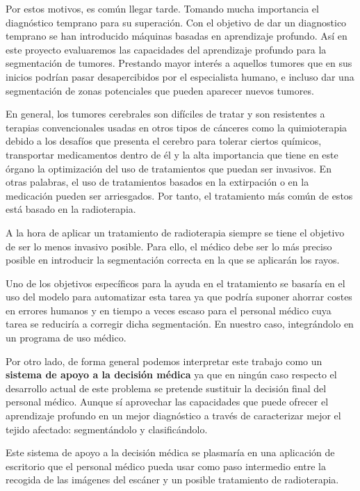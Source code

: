 Por estos motivos, es común llegar tarde. Tomando mucha importancia el diagnóstico temprano para su superación. Con el objetivo de dar un diagnostico temprano se han introducido máquinas basadas en aprendizaje profundo. Así en este proyecto evaluaremos las capacidades del aprendizaje profundo para la segmentación de tumores. Prestando mayor interés a aquellos tumores que en sus inicios podrían pasar desapercibidos por el especialista humano, e incluso dar una segmentación de zonas potenciales que pueden aparecer nuevos tumores.

En general, los tumores cerebrales son difíciles de tratar y son resistentes a terapias convencionales usadas en otros tipos de cánceres como la quimioterapia debido a los desafíos que presenta el cerebro para tolerar ciertos químicos, transportar medicamentos dentro de él y la alta importancia que tiene en este órgano la optimización del uso de tratamientos que puedan ser invasivos. En otras palabras, el uso de tratamientos basados en la extirpación o en la medicación pueden ser arriesgados. Por tanto, el tratamiento más común de estos está basado en la radioterapia.

A la hora de aplicar un tratamiento de radioterapia siempre se tiene el objetivo de ser lo menos invasivo posible. Para ello, el médico debe ser lo más preciso posible en introducir la segmentación correcta en la que se aplicarán los rayos. 

Uno de los objetivos específicos para la ayuda en el tratamiento se basaría en el uso del modelo para automatizar esta tarea ya que podría suponer ahorrar costes en errores humanos y en tiempo a veces escaso para el personal médico cuya tarea se reduciría a corregir dicha segmentación. En nuestro caso, integrándolo en un programa de uso médico. 

Por otro lado, de forma general podemos interpretar este trabajo como un \textbf{sistema de apoyo a la decisión médica} ya que en ningún caso respecto el desarrollo actual de este problema se pretende sustituir la decisión final del personal médico. Aunque sí aprovechar las capacidades que puede ofrecer el aprendizaje profundo en un mejor diagnóstico a través de caracterizar mejor el tejido afectado: segmentándolo y clasificándolo.

Este sistema de apoyo a la decisión médica se plasmaría en una aplicación de escritorio que el personal médico pueda usar como paso intermedio entre la recogida de las imágenes del escáner y un posible tratamiento de radioterapia.



